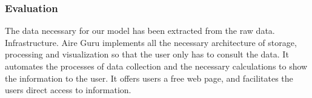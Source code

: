 \subsubsection*{Evaluation} 

\begin{itemize}
    \done The data necessary for our model has been extracted from the raw data.
    \done Infrastructure. Aire Guru implements all the necessary architecture of storage, processing and visualization so that the user only has to consult
    the data.
    \done It automates the processes of data collection and the necessary calculations to show the information to the user.
    \done It offers users a free web page, and facilitates the users direct access to information.
\end{itemize}